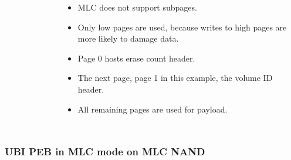 \documentclass[aspectratio=169,obeyspaces,spaces,hyphens,dvipsnames]{beamer}
\begin{document}
\begin{frame}[fragile]
\begin{columns}
\begin{figure}
     \end{figure}
    \begin{itemize}
    \item MLC does not support subpages.
    \item Only low pages are used, because writes to high pages are more likely to damage data.
    \item Page 0 hosts erase count header.
    \item The next page, page 1 in this example, the volume ID header.
    \item All remaining pages are used for payload.
    \end{itemize}
   \end{columns}
\end{frame}

\begin{frame}[fragile]
\frametitle{UBI PEB in MLC mode on MLC NAND}
   \begin{columns}
     \begin{figure}

\end{figure}
\end{columns}
\end{frame}
\end{document}
